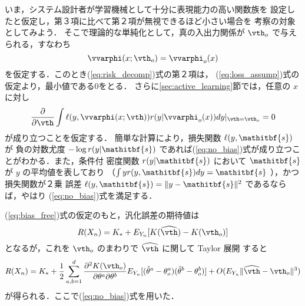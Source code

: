 \documentclass[master]{cimt}
\newcommand{\parder}[2]{\frac{\partial #1}{\partial #2}}
\newcommand{\hvth}{\widehat{{\vth}}}
\newcommand{\vs}{\mathitbf{s}}
\begin{document}

いま，システム設計者が学習機械として十分に表現能力の高い関数族を
設定したと仮定し，第３項に比べて第２項が無視できるほど小さい場合を
考察の対象としてみよう．
そこで理論的な単純化として，真の入出力関係が $\vth_o$ で与えられる，すなわち
\begin{equation}
\label{eq:bias_free}
	\vvarphi(x; \vth_o) = \vvarphi_o(x)
\end{equation}
を仮定する．このとき(\ref{eq:risk_decomp})式の第２項は，
(\ref{eq:loss_assump})式の仮定より，最小値である0をとる．
さらに\ref{sec:active_learning}節では，任意の $x$ に対し
\begin{equation}
\label{eq:no_bias}
\parder{}{\vth} \int \ell(y, \vvarphi(x; \vth)) 
r(y | \vvarphi_o(x)) dy |_{\vth=\vth_o} = 0
\end{equation}
が成り立つことを仮定する．
簡単な計算により，損失関数 $\ell(y, \vs)$ が 負の対数尤度 $- \log r(y | 
\vs)$ であれば(\ref{eq:no_bias})式が成り立つことがわかる．また，条件付
密度関数 $r(y| 
\vs)$ において $\vs$ が $y$ の平均値を表しており
（$\int y r(y, \vs) dy = \vs $ ），かつ損失関数が２乗
誤差 $\ell(y,\vs) = \| y - \vs \|^2$ であるならば，やはり
(\ref{eq:no_bias})式を満足する．

(\ref{eq:bias_free})式の仮定のもと，汎化誤差の期待値は
\begin{equation*}
	R(X_n) = K_* + E_{Y_n}[ K(\hvth) - K(\vth_o) ] 
\end{equation*}
となるが，これを $\vth_o$ のまわりで $\hvth$ に関して Taylor 展開
すると
\begin{equation}
\label{eq:risk_expansion}
	R(X_n) = K_* + \frac{1}{2} \sum_{a,b=1}^{d} 
	\frac{\partial^2 K(\vth_o) }{\partial \theta^a \partial\theta^b}
	E_{Y_n}
		[(\hat{\theta}^a - \theta_o^a)(\hat{\theta}^b - \theta_o^b) ]
		+ O(E_{Y_n}\| \hvth - \vth_o \|^3 ) 
\end{equation}
が得られる．ここで(\ref{eq:no_bias})式を用いた．
\end{document}
